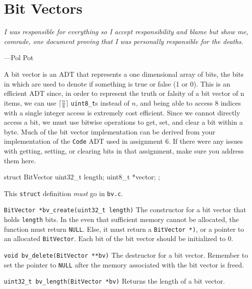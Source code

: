 \section{Bit Vectors}\label{bitvector}

\textwidth \epigraph{\emph{I was responsible for
everything so I accept responsibility and blame but show me, comrade,
one document proving that I was personally responsible for the deaths.}}
{---Pol Pot}

\noindent A bit vector is an ADT that represents a one dimensional array
of bits, the bits in which are used to denote if something is true or
false (1 or 0). This is an efficient ADT since, in order to represent
the truth or falsity of a bit vector of n items, we can use $\lceil
\frac{n}{8} \rceil$ \texttt{uint8\_t}s instead of $n$, and being able to
access 8 indices with a single integer access is extremely cost
efficient. Since we cannot directly access a bit, we must use bitwise
operations to get, set, and clear a bit within a byte. Much of the bit
vector implementation can be derived from your implementation of the
\texttt{Code} ADT used in assignment 6. If there were any issues with
getting, setting, or clearing bits in that assignment, make sure you
address them here.

\begin{clisting}{}
struct BitVector {
  uint32_t length;
  uint8_t *vector;
};
\end{clisting}

This \texttt{struct} definition \emph{must} go in \texttt{bv.c}.

\begin{funcdoc}{\texttt{BitVector *bv\_create(uint32\_t length)}}
  The constructor for a bit vector that holds \texttt{length} bits. In
  the even that sufficient memory cannot be allocated, the function must
  return \texttt{NULL}. Else, it must return a \texttt{BitVector *)}, or
  a pointer to an allocated \texttt{BitVector}. Each bit of the bit
  vector should be initialized to 0.
\end{funcdoc}

\begin{funcdoc}{\texttt{void bv\_delete(BitVector **bv)}}
  The destructor for a bit vector. Remember to set the pointer to
  \texttt{NULL} after the memory associated with the bit vector is
  freed.
\end{funcdoc}

\begin{funcdoc}{\texttt{uint32\_t bv\_length(BitVector *bv)}}
  Returns the length of a bit vector.
\end{funcdoc}

